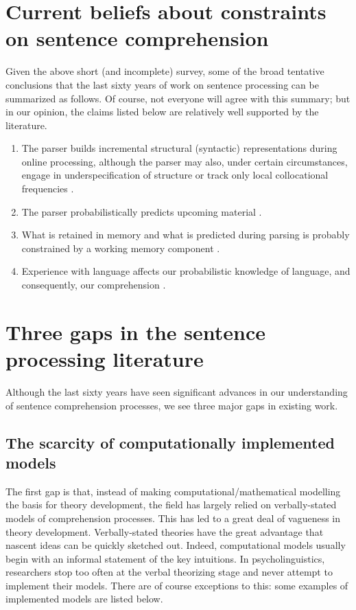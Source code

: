 \documentclass{cambridge7A}\usepackage[]{graphicx}\usepackage[]{color}
\begin{document}
\section{Current beliefs about constraints on sentence comprehension}

Given the above short (and incomplete) survey, some of the broad tentative conclusions that the last sixty years of work on sentence processing
can be summarized as follows. Of course, not everyone will agree with this summary; but in our opinion, the claims listed below are relatively well supported by the literature. 

\begin{enumerate}
\item The parser builds incremental structural (syntactic) representations during online processing, although the parser may also, under certain circumstances, engage in underspecification of structure or  track only local collocational frequencies \citep{FrazierRayner1982,TraxlerPickeringClifton1998,SwetsDesmetClifton2008,taboretal04}.
\item The parser probabilistically predicts upcoming material \citep{Hale2001,Levy2008}. 
\item What is retained in memory and what is predicted during parsing is probably constrained by a working memory component \citep{Gibson1998,Gibson2000,SafaviEtAlFrontiers2016,HusainEtAl2014,HusainVasishthNarayanan2015}. 
\item Experience with language affects our probabilistic knowledge of language, and consequently, our comprehension \citep{MacDonaldChristiansen2002,wellsetal}. 
\end{enumerate}

\section{Three gaps in the sentence processing literature}

Although the last sixty years have seen significant advances in our understanding of sentence comprehension processes, we see three major gaps in existing work. 

\subsection{The scarcity of computationally implemented models}

 
The first gap is that, instead of making computational/mathematical
modelling the basis for theory development, the field has largely 
relied on verbally-stated models of comprehension processes. This has
led to a great deal of vagueness in theory development.
Verbally-stated theories have the great advantage that nascent ideas can be
quickly sketched out. Indeed, computational models usually begin with an
informal statement of the key intuitions. In psycholinguistics,
researchers stop too often at the verbal theorizing stage and never
attempt to implement their models. There are of course exceptions to
this: some examples of implemented models are listed below.
\end{document}
